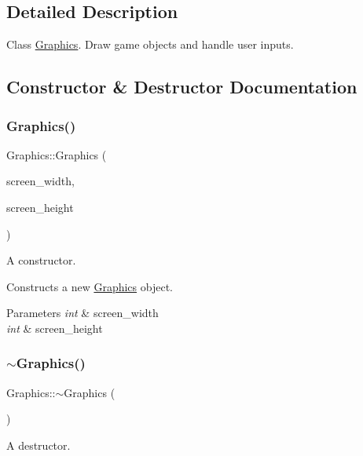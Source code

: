 \subsection{Detailed Description}
Class \mbox{\hyperlink{class_graphics}{Graphics}}. Draw game objects and handle user inputs. 

\subsection{Constructor \& Destructor Documentation}
\mbox{\label{class_graphics_ad02d1ced072b77d6177cb2ec6ea5b7df}} 
\subsubsection{\texorpdfstring{Graphics()}{Graphics()}}
{\footnotesize\ttfamily Graphics\+::\+Graphics (\begin{DoxyParamCaption}\item[{int}]{screen\+\_\+width,  }\item[{int}]{screen\+\_\+height }\end{DoxyParamCaption})}



A constructor. 

Constructs a new \mbox{\hyperlink{class_graphics}{Graphics}} object. 
\begin{DoxyParams}{Parameters}
{\em int} & screen\+\_\+width \\
\hline
{\em int} & screen\+\_\+height \\
\hline
\end{DoxyParams}
\mbox{\label{class_graphics_a7841c9a961ac9bca33bd30ddf8066cdb}} 
\subsubsection{\texorpdfstring{$\sim$\+Graphics()}{~Graphics()}}
{\footnotesize\ttfamily Graphics\+::$\sim$\+Graphics (\begin{DoxyParamCaption}{ }\end{DoxyParamCaption})}



A destructor. 

